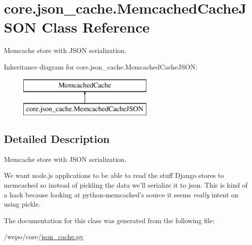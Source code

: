 \hypertarget{classcore_1_1json__cache_1_1MemcachedCacheJSON}{\section{core.\-json\-\_\-cache.\-Memcached\-Cache\-J\-S\-O\-N Class Reference}
\label{classcore_1_1json__cache_1_1MemcachedCacheJSON}
}


Memcache store with J\-S\-O\-N serialization.  


Inheritance diagram for core.\-json\-\_\-cache.\-Memcached\-Cache\-J\-S\-O\-N\-:\begin{figure}[H]
\begin{center}
\leavevmode
\includegraphics[height=2.000000cm]{classcore_1_1json__cache_1_1MemcachedCacheJSON}
\end{center}
\end{figure}


\subsection{Detailed Description}
Memcache store with J\-S\-O\-N serialization. 

We want node.\-js applications to be able to read the stuff Django stores to memcached so instead of pickling the data we'll serialize it to json. This is kind of a hack because looking at python-\/memcached's source it seems {\itshape really} intent on using pickle. 

The documentation for this class was generated from the following file\-:\begin{DoxyCompactItemize}
\item 
/wepo/core/\hyperlink{json__cache_8py}{json\-\_\-cache.\-py}\end{DoxyCompactItemize}
